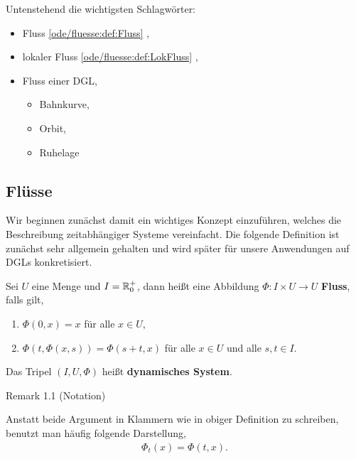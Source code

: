 Untenstehend die wichtigsten Schlagwörter:
\begin{itemize}
\item {} 
Fluss \cref{ode/fluesse:def:Fluss} ,

\item {} 
lokaler Fluss \cref{ode/fluesse:def:LokFluss} ,

\item {} 
Fluss einer DGL,
\begin{itemize}
\item {} 
Bahnkurve,

\item {} 
Orbit,

\item {} 
Ruhelage

\end{itemize}

\end{itemize}


\subsection{Flüsse}
\label{\detokenize{ode/fluesse:flusse}}
Wir beginnen zunächst damit ein wichtiges Konzept einzuführen, welches die Beschreibung zeitabhängiger Systeme vereinfacht. Die folgende Definition ist zunächst sehr allgemein gehalten und wird später für unsere Anwendungen auf DGLs konkretisiert.
\label{ode/fluesse:def:Fluss}
\begin{definition}{}{}



Sei \(U\) eine Menge und \(I=\mathbb{R}^+_0\), dann heißt eine Abbildung \(\Phi:I\times U\rightarrow U\) \textbf{Fluss}, falls gilt,
\begin{enumerate}

\item {} 
\(\Phi(0, x) = x\) für alle \(x\in U\),

\item {} 
\(\Phi(t, \Phi(x,s)) = \Phi(s + t, x)\) für alle \(x\in U\) und alle \(s,t\in I\).

\end{enumerate}

Das Tripel \((I, U, \Phi)\) heißt \textbf{dynamisches System}.
\end{definition}
\label{ode/fluesse:remark-1}
\begin{emphBox}{}{}{Remark 1.1 (Notation)}



Anstatt beide Argument in Klammern wie in obiger Definition zu schreiben, benutzt man häufig folgende Darstellung,
\begin{align*}
\Phi_t(x) = \Phi(t, x).
\end{align*}\end{emphBox}

